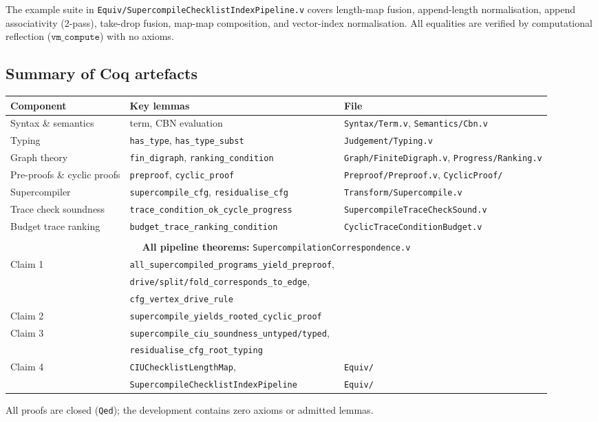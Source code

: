 The example suite in \texttt{Equiv/SupercompileChecklistIndexPipeline.v} covers length-map fusion, append-length normalisation, append associativity (2-pass), take-drop fusion, map-map composition, and vector-index normalisation. All equalities are verified by computational reflection ($\texttt{vm\_compute}$) with no axioms.

\subsection{Summary of Coq artefacts}

\begin{center}
\small
\begin{tabular}{p{} p{} p{}}
\toprule
\textbf{Component} & \textbf{Key lemmas} & \textbf{File} \\
\midrule
Syntax \& semantics & term, CBN evaluation & \texttt{Syntax/Term.v}, \texttt{Semantics/Cbn.v} \\
Typing & \texttt{has\_type}, \texttt{has\_type\_subst} & \texttt{Judgement/Typing.v} \\
Graph theory & \texttt{fin\_digraph}, \texttt{ranking\_condition} & \texttt{Graph/FiniteDigraph.v}, \texttt{Progress/Ranking.v} \\
Pre-proofs \& cyclic proofs & \texttt{preproof}, \texttt{cyclic\_proof} & \texttt{Preproof/Preproof.v}, \texttt{CyclicProof/} \\
Supercompiler & \texttt{supercompile\_cfg}, \texttt{residualise\_cfg} & \texttt{Transform/Supercompile.v} \\
Trace check soundness & \texttt{trace\_condition\_ok\_cycle\_progress} & \texttt{SupercompileTraceCheckSound.v} \\
Budget trace ranking & \texttt{budget\_trace\_ranking\_condition} & \texttt{CyclicTraceConditionBudget.v} \\
\bottomrule
\multicolumn{3}{c}{} \\
\multicolumn{3}{c}{\textbf{All pipeline theorems:} \texttt{SupercompilationCorrespondence.v}} \\
\midrule
Claim 1 & \texttt{all\_supercompiled\_programs\_yield\_preproof}, & \\
 & \texttt{drive/split/fold\_corresponds\_to\_edge}, & \\
 & \texttt{cfg\_vertex\_drive\_rule} & \\
Claim 2 & \texttt{supercompile\_yields\_rooted\_cyclic\_proof} & \\
Claim 3 & \texttt{supercompile\_ciu\_soundness\_untyped/typed}, & \\
 & \texttt{residualise\_cfg\_root\_typing} & \\
Claim 4 & \texttt{CIUChecklistLengthMap}, & \texttt{Equiv/} \\
 & \texttt{SupercompileChecklistIndexPipeline} & \texttt{Equiv/} \\
\bottomrule
\end{tabular}
\end{center}

All proofs are closed (\texttt{Qed}); the development contains zero axioms or admitted lemmas.
